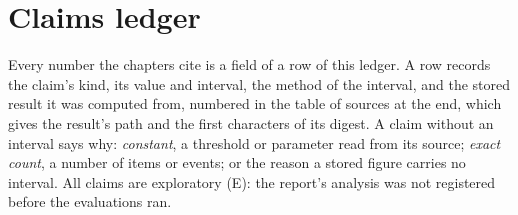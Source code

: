 \chapter{Claims ledger}\label{app:claims-ledger}

Every number the chapters cite is a field of a row of this ledger. A row records the claim's kind, its value and
interval, the method of the interval, and the stored result it was computed from, numbered in the table of sources at
the end, which gives the result's path and the first characters of its digest. A claim without an interval says why:
\emph{constant}, a threshold or parameter read from its source; \emph{exact count}, a number of items or events; or
the reason a stored figure carries no interval. All claims are exploratory (E): the report's analysis was not
registered before the evaluations ran.

